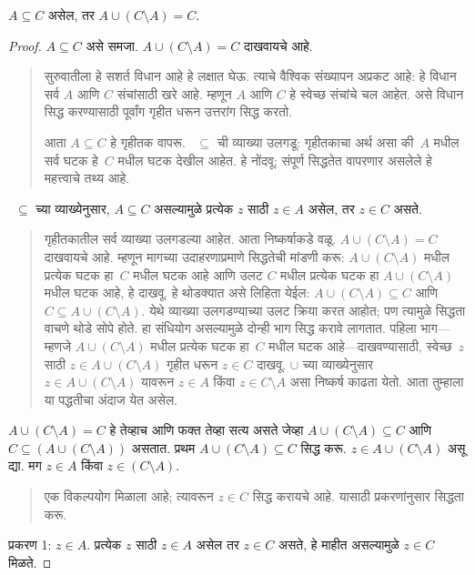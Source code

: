 \begin{prop}
$A \subseteq C$ असेल, तर $A \cup (C \setminus A) = C$.
\end{prop}

\begin{proof}
$A \subseteq C$ असे समजा. $A \cup (C \setminus A) = C$ दाखवायचे आहे.
\begin{quote}
सुरुवातीला हे सशर्त विधान आहे हे लक्षात घेऊ. त्याचे वैश्विक संख्यापन अप्रकट आहे: हे विधान सर्व $A$ आणि $C$ संचांसाठी खरे आहे. म्हणून $A$ आणि $C$ हे स्वेच्छ संचांचे चल आहेत. असे विधान सिद्ध करण्यासाठी पूर्वांग गृहीत धरून उत्तरांग सिद्ध करतो.

आता $A \subseteq C$ हे गृहीतक वापरू. ~$\subseteq$ ची व्याख्या उलगडू: गृहीतकाचा अर्थ असा की~$A$ मधील सर्व घटक हे~$C$ मधील घटक देखील आहेत. हे नोंदवू; संपूर्ण सिद्धतेत वापरणार असलेले हे महत्त्वाचे तथ्य आहे.
\end{quote}
~$\subseteq$ च्या व्याख्येनुसार, $A \subseteq C$ असल्यामुळे प्रत्येक $z$ साठी $z \in A$ असेल, तर $z \in C$ असते.
\begin{quote}
गृहीतकातील सर्व व्याख्या उलगडल्या आहेत. आता निष्कर्षाकडे वळू. $A \cup (C \setminus A) = C$ दाखवायचे आहे. म्हणून मागच्या उदाहरणाप्रमाणे सिद्धतेची मांडणी करू: $A \cup (C \setminus A)$ मधील प्रत्येक घटक हा~$C$ मधील घटक आहे आणि उलट $C$ मधील प्रत्येक घटक हा $A \cup (C \setminus A)$ मधील घटक आहे, हे दाखवू. हे थोडक्यात असे लिहिता येईल: $A \cup (C \setminus A) \subseteq C$ आणि $C \subseteq A \cup (C \setminus A)$. येथे व्याख्या उलगडण्याच्या उलट क्रिया करत आहोत; पण त्यामुळे सिद्धता वाचणे थोडे सोपे होते. हा संधियोग असल्यामुळे दोन्ही भाग सिद्ध करावे लागतात. पहिला भाग---म्हणजे $A \cup (C \setminus A)$ मधील प्रत्येक घटक हा~$C$ मधील घटक आहे---दाखवण्यासाठी, स्वेच्छ~$z$ साठी $z \in A \cup (C \setminus A)$ गृहीत धरून $z \in C$ दाखवू. $\cup$ च्या व्याख्येनुसार $z \in A \cup (C \setminus A)$ यावरून $z \in A$ किंवा $z \in C \setminus A$ असा निष्कर्ष काढता येतो. आता तुम्हाला या पद्धतीचा अंदाज येत असेल.
\end{quote}
$A \cup (C \setminus A) = C$ हे तेव्हाच आणि फक्त तेव्हा सत्य असते जेव्हा $A \cup (C \setminus A) \subseteq C$ आणि $C \subseteq (A \cup (C \setminus A))$ असतात. प्रथम $A \cup (C \setminus A) \subseteq C$ सिद्ध करू. $z \in A \cup (C \setminus A)$ असू द्या. मग $z \in A$ किंवा $z \in (C \setminus A)$.
\begin{quote}
एक विकल्पयोग मिळाला आहे; त्यावरून $z \in C$ सिद्ध करायचे आहे. यासाठी प्रकरणांनुसार सिद्धता करू.
\end{quote}
प्रकरण 1: $z \in A$. प्रत्येक $z$ साठी $z \in A$ असेल तर $z \in C$ असते, हे माहीत असल्यामुळे $z \in C$ मिळते.

\end{proof}
